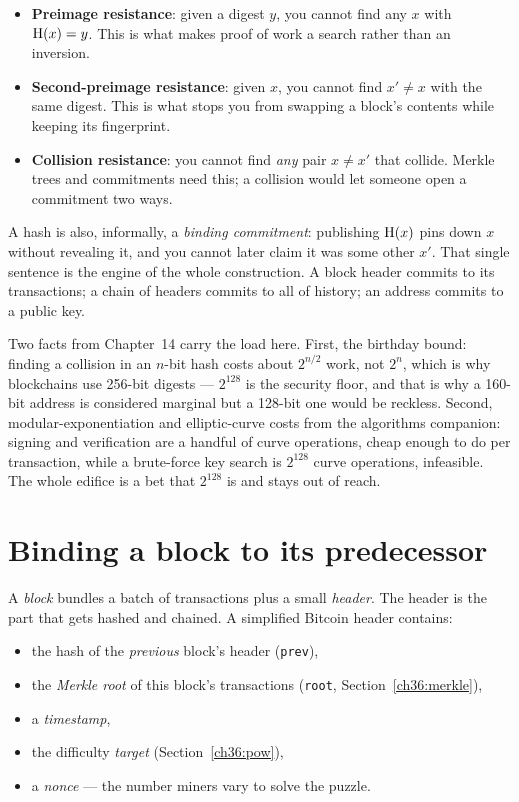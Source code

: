 \begin{itemize}
  \item \textbf{Preimage resistance}: given a digest $y$, you cannot find any $x$ with $\operatorname{H}(x)=y$. This is what makes proof of work a search rather than an inversion.
  \item \textbf{Second-preimage resistance}: given $x$, you cannot find $x'\ne x$ with the same digest. This is what stops you from swapping a block's contents while keeping its fingerprint.
  \item \textbf{Collision resistance}: you cannot find \emph{any} pair $x\ne x'$ that collide. Merkle trees and commitments need this; a collision would let someone open a commitment two ways.
\end{itemize}

A hash is also, informally, a \emph{binding commitment}: publishing $\operatorname{H}(x)$ pins down $x$ without revealing it, and you cannot later claim it was some other $x'$. That single sentence is the engine of the whole construction. A block header commits to its transactions; a chain of headers commits to all of history; an address commits to a public key.

\begin{connectionbox}
Two facts from Chapter~14 carry the load here. First, the birthday bound: finding a collision in an $n$-bit hash costs about $2^{n/2}$ work, not $2^{n}$, which is why blockchains use 256-bit digests --- $2^{128}$ is the security floor, and that is why a 160-bit address is considered marginal but a 128-bit one would be reckless. Second, modular-exponentiation and elliptic-curve costs from the algorithms companion: signing and verification are a handful of curve operations, cheap enough to do per transaction, while a brute-force key search is $2^{128}$ curve operations, infeasible. The whole edifice is a bet that $2^{128}$ is and stays out of reach.
\end{connectionbox}

\section{Binding a block to its predecessor}
\label{ch36:chain}

A \emph{block} bundles a batch of transactions plus a small \emph{header}. The header is the part that gets hashed and chained. A simplified Bitcoin header contains:

\begin{itemize}
  \item the hash of the \emph{previous} block's header (\texttt{prev}),
  \item the \emph{Merkle root} of this block's transactions (\texttt{root}, Section~\ref{ch36:merkle}),
  \item a \emph{timestamp},
  \item the difficulty \emph{target} (Section~\ref{ch36:pow}),
  \item a \emph{nonce} --- the number miners vary to solve the puzzle.
\end{itemize}

